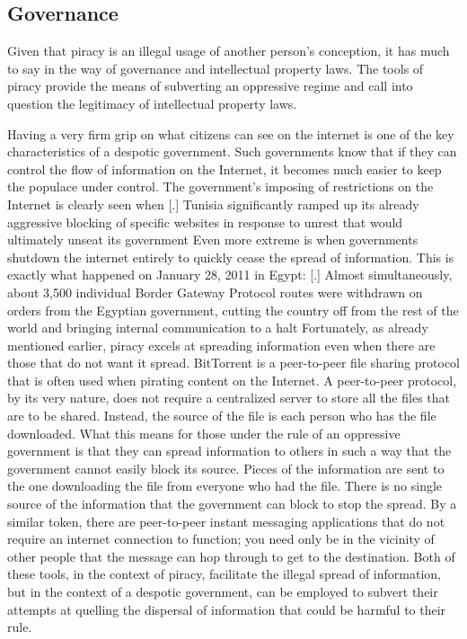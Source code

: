 \documentclass[onecolumn, 12pt]{article}
\begin{document}
\begin{refsection}
\subsection{Governance}
Given that piracy is an illegal usage of another person's conception, it has much to say
in the way of governance and intellectual property laws. The tools of piracy provide the
means of subverting an oppressive regime and call into question the legitimacy of
intellectual property laws.

Having a very firm grip on what citizens can see on the internet is one of the key
characteristics of a despotic government. Such governments know that if they can control
the flow of information on the Internet, it becomes much easier to keep the populace under
control. The government's imposing of restrictions on the Internet is clearly seen when
[.]{%
  Tunisia significantly ramped up its already aggressive blocking of specific
  websites in response to unrest that would ultimately unseat its government%
} Even more extreme is when governments shutdown the internet entirely to
quickly cease the spread of information. This is exactly what happened on
January 28, 2011 in Egypt: [.]{%
  Almost simultaneously, about 3,500 individual Border Gateway Protocol routes
  \textelp{} were withdrawn on orders from the Egyptian government, cutting the
  country off from the rest of the world and bringing internal communication to
  a halt%
} Fortunately, as already mentioned earlier, piracy excels at spreading
information even when there are those that do not want it spread. BitTorrent is
a peer-to-peer file sharing protocol that is often used when pirating content on the
Internet. A peer-to-peer protocol, by its very nature, does not require a centralized
server to store all the files that are to be shared. Instead, the source of the file is
each person who has the file downloaded. What this means for those under the rule of an
oppressive government is that they can spread information to others in such a way that the
government cannot easily block its source. Pieces of the information are sent to the one
downloading the file from everyone who had the file. There is no single source of the
information that the government can block to stop the spread. By a similar token, there
are peer-to-peer instant messaging applications that do not require an internet connection
to function; you need only be in the vicinity of other people that the message can hop
through to get to the destination. Both of these tools, in the context of piracy, facilitate
the illegal spread of information, but in the context of a despotic government, can be
employed to subvert their attempts at quelling the dispersal of information that could be
harmful to their rule.


\end{refsection}
\end{document}
